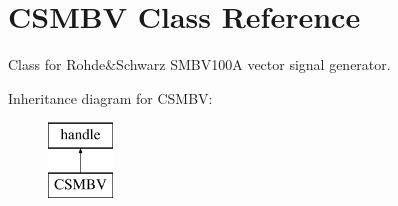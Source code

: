 \hypertarget{class_c_s_m_b_v}{\section{C\-S\-M\-B\-V Class Reference}
\label{class_c_s_m_b_v}
}


Class for Rohde\&Schwarz S\-M\-B\-V100\-A vector signal generator.  


Inheritance diagram for C\-S\-M\-B\-V\-:\begin{figure}[H]
\begin{center}
\leavevmode
\includegraphics[height=2.000000cm]{class_c_s_m_b_v}
\end{center}
\end{figure}
